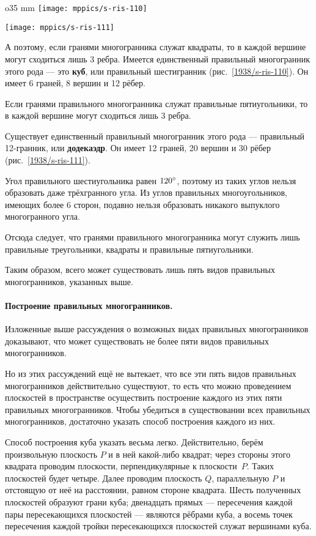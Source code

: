 \begin{wrapfigure}{o}{35 mm}
\vskip-0mm
\centering
\texttt{[image: mppics/s-ris-110]}
\caption{}\label{1938/s-ris-110}
\bigskip
\texttt{[image: mppics/s-ris-111]}
\caption{}\label{1938/s-ris-111}
\vskip-0mm
\end{wrapfigure}

А поэтому, если гранями многогранника служат квадраты, то в каждой вершине могут сходиться лишь 3 ребра.
Имеется единственный правильный многогранник этого рода — это \textbf{куб}, или правильный шестигранник (рис.~\ref{1938/s-ris-110}).
Он имеет 6 граней, 8 вершин и 12 рёбер.

Если гранями правильного многогранника служат правильные пятиугольники, то в каждой вершине могут сходиться лишь 3 ребра.

Существует единственный правильный многогранник этого рода — правильный 12-гранник, или \textbf{додекаэдр}.
Он имеет 12 граней, 20 вершин и 30 рёбер (рис.~\ref{1938/s-ris-111}).

Угол правильного шестиугольника равен $120\degree$, поэтому из таких углов нельзя образовать даже трёхгранного угла.
Из углов правильных многоугольников, имеющих более 6 сторон, подавно нельзя образовать никакого выпуклого многогранного угла.

Отсюда следует, что гранями правильного многогранника могут служить лишь правильные треугольники, квадраты и правильные пятиугольники.

Таким образом, всего может существовать лишь пять видов правильных многогранников, указанных выше.

\paragraph{Построение правильных многогранников.}\label{1938/s98}
Изложенные выше рассуждения о возможных видах правильных многогранников доказывают, что может существовать не более пяти видов правильных многогранников.

Но из этих рассуждений ещё не вытекает, что все эти пять видов правильных многогранников действительно существуют, то есть что можно проведением плоскостей в пространстве осуществить построение каждого из этих пяти правильных многогранников.
Чтобы убедиться в существовании всех правильных многогранников, достаточно указать способ построения каждого из них.

Способ построения куба указать весьма легко.
Действительно, берём произвольную плоскость $P$ и в ней какой-либо квадрат;
через стороны этого квадрата проводим плоскости, перпендикулярные к плоскости~$P$.
Таких плоскостей будет четыре.
Далее проводим плоскость $Q$, параллельную $P$ и отстоящую от неё на расстоянии, равном стороне квадрата.
Шесть полученных плоскостей образуют грани куба;
двенадцать прямых — пересечения каждой пары пересекающихся плоскостей — являются рёбрами куба, а восемь точек пересечения каждой тройки пересекающихся плоскостей служат вершинами куба.

